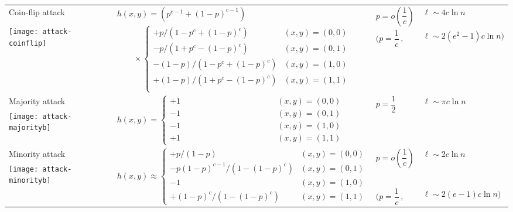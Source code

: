 \documentclass[10pt,a4paper,twocolumn]{article}
\begin{document}
\begin{table*}[t]
\begin{small}
\begin{tabular}{p{2.8cm}p{8.2cm}p{2.2cm}p{3cm}}
\midrule
    Coin-flip attack & $h(x,y) = \left(p^{c-1} + (1 - p)^{c-1}\right)$ & \multirow{2}{*}{$p = o\left(\dfrac{1}{c}\right)$} & \multirow{2}{*}{$\ell \sim 4 c \ln n$} \\
	\multirow{4}{*}{\texttt{[image: attack-coinflip]}}	& \multirow{4}{*}{$\qquad \times \begin{cases}
	+p/(1 - p^c + (1 - p)^c) \qquad \quad \ \	& (x,y) = (0,0) \\ 
	-p/(1 + p^c - (1 - p)^c)					& (x,y) = (0,1) \\ 
	-(1 - p)/(1 - p^c + (1 - p)^c)				& (x,y) = (1,0) \\ 
	+(1 - p)/(1 + p^c - (1 - p)^c)				& (x,y) = (1,1) \\ 
	\end{cases}$} & & \\ & & \multirow{2}{*}{$\Big(p = \dfrac{1}{c}\, ,$} & \multirow{2}{*}{$\ell \sim 2(e^2-1) c \ln n\Big)$} \\
		& & & \\
		& & & \\
    \midrule
    \hyphenation{voting}
    Majority attack & \multirow{4}{*}{$h(x,y) = \begin{cases} 
	+1 \qquad \qquad \qquad \qquad \qquad \quad	& (x,y) = (0,0) \\
	-1 											& (x,y) = (0,1) \\
	-1 											& (x,y) = (1,0) \\ 
	+1											& (x,y) = (1,1) 
	\end{cases}$} &	\multirow{2}{*}{$p = \dfrac{1}{2}$} & \multirow{2}{*}{$\ell \sim \pi c \ln n$} \\
	\multirow{3}{*}{\texttt{[image: attack-majorityb]}} & & & \\
		& & & \\
		& & & \\
    \midrule
    Minority attack & \multirow{4}{*}{$h(x,y) \approx \begin{cases} 
	+p/(1 - p) 									& (x,y) = (0,0) \\
	-p(1 - p)^{c - 1}/(1 - (1 - p)^c) 			& (x,y) = (0,1) \\
	-1 											& (x,y) = (1,0) \\ 
	+(1 - p)^c/(1 - (1 - p)^c)					& (x,y) = (1,1) 
	\end{cases}$} &	\multirow{2}{*}{$p = o\left(\dfrac{1}{c}\right)$} & \multirow{2}{*}{$\ell \sim 2 c \ln n$} \\
	\multirow{3}{*}{\texttt{[image: attack-minorityb]}}		& & & \\ & & \multirow{2}{*}{$\Big(p = \dfrac{1}{c}\, ,$} & \multirow{2}{*}{$\ell \sim 2(e-1) c \ln n\Big)$} \\

\end{tabular}
\end{small}
\end{table*}
\end{document}
